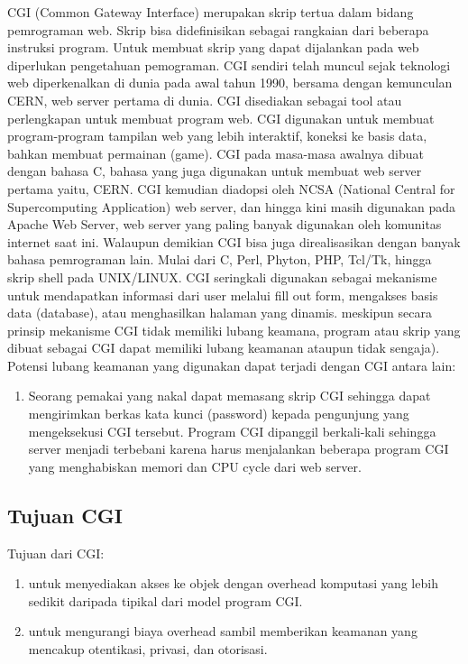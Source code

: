 	CGI (Common Gateway Interface) merupakan skrip tertua dalam bidang pemrograman web. Skrip bisa didefinisikan sebagai rangkaian dari beberapa instruksi program. Untuk membuat skrip yang dapat dijalankan pada web diperlukan pengetahuan pemograman. 
	CGI sendiri telah muncul sejak teknologi web diperkenalkan di dunia pada awal tahun 1990, bersama dengan kemunculan CERN, web server pertama di dunia. CGI disediakan sebagai tool atau perlengkapan untuk membuat program web. CGI digunakan untuk membuat program-program tampilan web yang lebih interaktif, koneksi ke basis data, bahkan membuat permainan (game). 
	CGI pada masa-masa awalnya dibuat dengan bahasa C, bahasa yang juga digunakan untuk membuat web server pertama yaitu, CERN. CGI kemudian diadopsi oleh NCSA (National Central for Supercomputing Application) web server, dan hingga kini masih digunakan pada Apache Web Server, web server yang paling banyak digunakan oleh komunitas internet saat ini.
	Walaupun demikian CGI bisa juga direalisasikan dengan banyak bahasa pemrograman lain. Mulai dari C, Perl, Phyton, PHP, Tcl/Tk, hingga skrip shell pada UNIX/LINUX. 
	CGI seringkali digunakan sebagai mekanisme untuk mendapatkan informasi dari user melalui fill out form, mengakses basis data (database), atau menghasilkan halaman yang dinamis. meskipun secara prinsip mekanisme CGI tidak memiliki lubang keamana, program atau skrip yang dibuat sebagai CGI dapat memiliki lubang keamanan ataupun tidak sengaja). Potensi lubang keamanan yang digunakan dapat terjadi dengan CGI antara lain: 
\begin{enumerate}
\item Seorang pemakai yang nakal dapat memasang skrip CGI sehingga dapat mengirimkan berkas kata kunci (password) kepada pengunjung yang mengeksekusi CGI tersebut. 
\tem Program CGI dipanggil berkali-kali sehingga server menjadi terbebani karena harus menjalankan beberapa program CGI yang menghabiskan memori dan CPU cycle dari web server.
\end{enumerate}
\subsection{Tujuan CGI}
Tujuan dari CGI:
\begin{enumerate}
\item untuk menyediakan akses ke objek dengan overhead komputasi yang lebih sedikit daripada tipikal dari model program CGI.
\item untuk mengurangi biaya overhead sambil memberikan keamanan yang mencakup otentikasi, privasi, dan otorisasi.
\end{enumerate}
